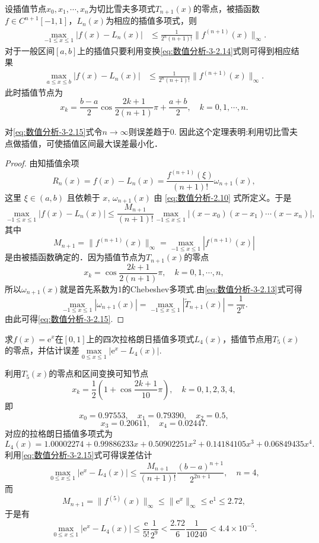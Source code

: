 \documentclass[../../main.tex]{subfiles}
\begin{document}
\begin{theorem}
设插值节点$x_0,x_1,\cdots,x_n$为切比雪夫多项式$T_{n+1}(x)$的零点，被插函数$f \in C^{n+1}[-1,1]$，$L_n(x)$为相应的插值多项式，则
\begin{align}\label{eq:数值分析-3-2.15}
\max_{-1 \leq x \leq 1} |f(x) - L_n(x)| &\leq \frac{1}{2^n (n+1)!}\|f^{(n+1)}(x)\|_\infty.
\end{align}
对于一般区间$[a,b]$上的插值只要利用变换\eqref{eq:数值分析-3-2.14}式则可得到相应结果
\begin{align*}
\max_{a \leq x \leq b} |f(x) - L_n(x)| &\leq \frac{1}{2^n (n+1)!}\|f^{(n+1)}(x)\|_\infty.
\end{align*}
此时插值节点为
$$x_k = \frac{b - a}{2}\cos\frac{2k+1}{2(n+1)}\pi + \frac{a + b}{2},\quad k = 0,1,\cdots,n.$$
\end{theorem}
\begin{note}
对\eqref{eq:数值分析-3-2.15}式令$n\to \infty$则误差趋于0. 因此这个定理表明:利用切比雪夫点做插值，可使插值区间最大误差最小化．
\end{note}
\begin{proof}
由知插值余项
$$R_n(x) = f(x) - L_n(x) = \frac{f^{(n+1)}(\xi)}{(n+1)!}\omega_{n+1}(x),$$
这里 $\xi \in (a, b)$ 且依赖于 $x$,$\,\,\omega_{n + 1}(x)$ 由 \eqref{eq:数值分析-2.10} 式所定义。于是
$$\max_{-1 \leq x \leq 1} |f(x) - L_n(x)| \leq \frac{M_{n+1}}{(n+1)!}\max_{-1 \leq x \leq 1} |(x - x_0)(x - x_1)\cdots(x - x_n)|,$$
其中
$$M_{n+1} = \|f^{(n+1)}(x)\|_\infty = \max_{-1 \leq x \leq 1} |f^{(n+1)}(x)|$$
是由被插函数确定的．因为插值节点为$T_{n+1}(x)$的零点
$$x_k = \cos\frac{2k+1}{2(n+1)}\pi,\quad k = 0,1,\cdots,n,$$
所以$\omega_{n+1}(x)$就是首先系数为1的Chebeshev多项式.由\eqref{eq:数值分析-3-2.13}式可得
$$\max_{-1 \leq x \leq 1} |\omega_{n+1}(x)| = \max_{-1 \leq x \leq 1} |\widetilde{T}_{n+1}(x)| = \frac{1}{2^n}.$$
由此可得\eqref{eq:数值分析-3-2.15}.
\end{proof}

\begin{example}
求$f(x) = \mathrm{e}^x$在$[0,1]$上的四次拉格朗日插值多项式$L_4(x)$，插值节点用$T_5(x)$的零点，并估计误差$\max\limits_{0 \leq x \leq 1} |\mathrm{e}^x - L_4(x)|$.
\end{example}
\begin{solution}
利用$T_5(x)$的零点和区间变换可知节点
$$x_k = \frac{1}{2}\left(1 + \cos\frac{2k+1}{10}\pi\right),\quad k = 0,1,2,3,4,$$
即
$$x_0 = 0.97553,\quad x_1 = 0.79390,\quad x_2 = 0.5,$$
$$x_3 = 0.20611,\quad x_4 = 0.02447.$$
对应的拉格朗日插值多项式为
$$L_4(x) = 1.00002274 + 0.99886233x + 0.50902251x^2 + 0.14184105x^3 + 0.06849435x^4.$$
利用\eqref{eq:数值分析-3-2.15}式可得误差估计
$$\max\limits_{0 \leq x \leq 1} |\mathrm{e}^x - L_4(x)| \leq \frac{M_{n+1}}{(n+1)!} \frac{(b - a)^{n+1}}{2^{2n+1}},\quad n = 4,$$
而
$$M_{n+1} = \|f^{(5)}(x)\|_\infty \leq \|\mathrm{e}^x\|_\infty \leq \mathrm{e}^1 \leq 2.72,$$
于是有
$$\max\limits_{0 \leq x \leq 1} |\mathrm{e}^x - L_4(x)| \leq \frac{\mathrm{e}}{5!} \frac{1}{2^9} < \frac{2.72}{6} \frac{1}{10240} < 4.4 \times 10^{-5}.$$
\end{solution}
\end{document}
